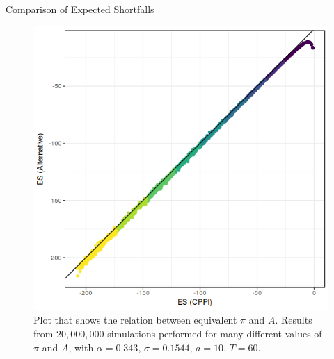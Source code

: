\documentclass[10pt]{beamer}
\begin{document}
\begin{frame}[fragile]{Comparison of Expected Shortfalls}
  \begin{figure}[h]
    \centering
    \includegraphics[scale=0.35]{es-es_pi.png}
    \caption{Plot that shows the relation between equivalent $\pi$ and $A$. Results from $20,000,000$ simulations performed for many different values of $\pi$ and $A$, with $\alpha = 0.343$, $\sigma = 0.1544$, $a = 10$, $T = 60$.}
    \label{fig:es}
  \end{figure}
\end{frame}
\end{document}
